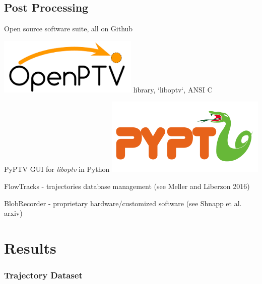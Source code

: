 \documentclass[aspectratio=43]{beamer}
\begin{document}
%
%

	 
\subsection{Post Processing}

\begin{frame}{Open source software suite, all on Github}
\itemize
\item \includegraphics[width=0.5\textwidth]{openptv} \hspace{1em} library, `liboptv`, ANSI C
\item PyPTV GUI for {\em liboptv} in Python \includegraphics[width=.3\textwidth]{pyptv}
\item FlowTracks - trajectories database management (see Meller and Liberzon 2016)
\item BlobRecorder - proprietary hardware/customized software (see Shnapp et al. arxiv)
\end{frame}



\section{Results}\label{sec:results}
\subsubsection*{Trajectory Dataset}
%
\begin{frame}[label=result-5]
	\centering
\end{frame}
\end{document}
